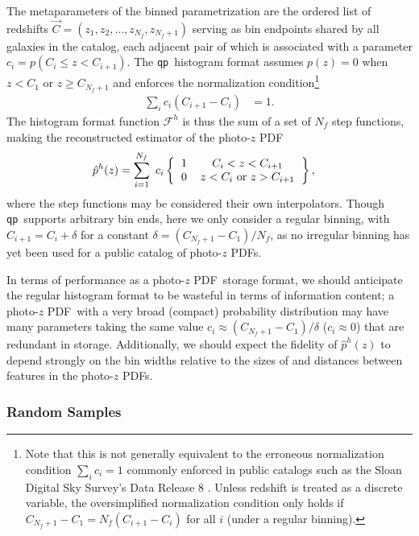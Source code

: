 \documentclass[\docopts]{\docclass}
\newcommand{\qp}{\texttt{qp}}
\newcommand{\pz}{photo-$z$ PDF}
\begin{document}
The metaparameters of the binned parametrization are the ordered list of 
redshifts $\vec{C} = (z_{1}, z_{2}, \dots, z_{N_{f}}, z_{N_{f}+1})$ serving as 
bin endpoints shared by all galaxies in the catalog, each adjacent pair of 
which is associated with a parameter $c_{i} = p(C_{i} \leq z < C_{i+1})$.
The \qp\ histogram format assumes $p(z)=0$ when $z<C_{1}$ or $z\geq 
C_{N_{f}+1}$ and enforces the normalization condition\footnote{
Note that this is not generally equivalent to the erroneous normalization 
condition $\sum_{i} c_{i} = 1$ commonly enforced in public catalogs such as the 
Sloan Digital Sky Survey's Data Release 8 \citep{sheldon_photometric_2012}.
Unless redshift is treated as a discrete variable, the oversimplified 
normalization condition only holds if $C_{N_{f}+1} - C_{1} = N_{f} (C_{i+1} - 
C_{i})$ for all $i$ (under a regular binning).
}
\begin{align}
  \label{eq:normed}
  \sum_{i} c_{i} (C_{i+1} - C_{i}) &= 1.
\end{align}
The histogram format function $\mathcal{F}^{h}$ is thus the sum of a set of 
$N_{f}$ step functions, making the reconstructed estimator of the \pz
\begin{align}
  \label{eq:binned}
  \hat{p}^{h}(z) &= \sum_{i=1}^{N_{f}}\ c_{i} 
\left\{\begin{tabular}{cc}$1$&$C_{i}<z<C_{i+1}$\\
0&$z < C_{i}$\ or\ $z > C_{i+1}$\end{tabular}\right\},
\end{align}
where the step functions may be considered their own interpolators.
Though \qp\ supports arbitrary bin ends, here we only consider a regular 
binning, with $C_{i+1} = C_{i} + \delta$ for a constant $\delta = (C_{N_{f}+1} 
- C_{1}) / N_{f}$, as no irregular binning has yet been used for a public 
catalog of \pz s.

In terms of performance as a \pz\ storage format, we should anticipate the 
regular histogram format to be wasteful in terms of information content; a \pz\ 
with a very broad (compact) probability distribution may have many parameters 
taking the same value $c_{i} \approx (C_{N_{f}+1} - C_{1}) / \delta$ 
($c_{i}\approx0$) that are redundant in storage.
Additionally, we should expect the fidelity of $\hat{p}^{h}(z)$ to depend 
strongly on the bin widths relative to the sizes of and distances between 
features in the \pz s.

\subsubsection{Random Samples}
\label{sec:samples}
\end{document}
